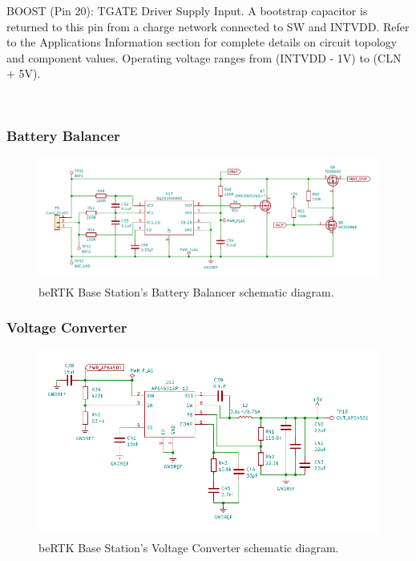 BOOST (Pin 20): TGATE Driver Supply Input. A bootstrap
capacitor is returned to this pin from a charge network
connected to SW and INTVDD. Refer to the Applications
Information section for complete details on circuit topology
and component values. Operating voltage ranges from
(INTVDD - 1V) to (CLN + 5V).

~\cite{LTC4012}
\subsubsection{Battery Balancer}\label{sec:3212_BQ29209}

\begin{figure}[h]
	\centering
	\includegraphics[width=1.0\textwidth]{Chapters/Figures/chapter3/Battery_Balancer.pdf}
	\caption{beRTK\textsuperscript{\textregistered} Base Station's Battery Balancer schematic diagram.}
	\label{fig:BQ29209_circuit}
\end{figure}

\subsubsection{Voltage Converter}\label{sec:3213_AP64501}

\begin{figure}[h]
	\centering
	\includegraphics[width=1.0\textwidth]{Chapters/Figures/chapter3/Voltage_Converter.pdf}
	\caption{beRTK\textsuperscript{\textregistered} Base Station's Voltage Converter schematic diagram.}
	\label{fig:AP64501_circuit}
\end{figure}


